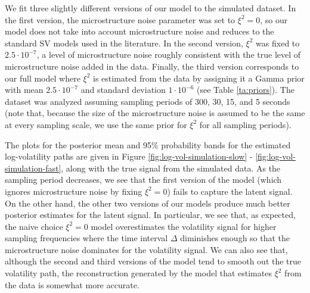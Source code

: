 We fit three slightly different versions of our model to the simulated dataset.  In the first version, the microstructure noise parameter was set to $\xi^2 = 0$, so our model does not take into account microstructure noise and reduces to the standard SV models used in the literature. In the second version, $\xi^2$ was fixed to $2.5\cdot 10^{-7}$, a level of microstructure noise roughly consistent with the true level of microstructure noise added in the data.  Finally, the third version corresponds to our full model where $\xi^2$ is estimated from the data by assigning it a Gamma prior with mean $2.5\cdot 10^{-7}$ and standard deviation $1\cdot 10^{-6}$ (see Table \ref{ta:priors}).  The dataset was analyzed assuming sampling periods of 300, 30, 15, and 5 seconds (note that, because the size of the microstructure noise is assumed to be the same at every sampling scale, we use the same prior for $\xi^2$ for all sampling periods).

The plots for the posterior mean and 95\% probability bands for the estimated log-volatility paths are given in Figure \ref{fig:log-vol-simulation-slow} - \ref{fig:log-vol-simulation-fast}, along with the true signal from the simulated data. As the sampling period decreases, we see that the first version of the model (which ignores microstructure noise by fixing $\xi^2 = 0$) fails to capture the latent signal. On the other hand, the other two versions of our models produce much better posterior estimates for the latent signal. In particular, we see that, as expected, the naive choice $\xi^2 = 0$ model overestimates the volatility signal for higher sampling frequencies where the time interval $\Delta$ diminishes enough so that the microstructure noise dominates for the volatility signal.  We can also see that, although the second and third versions of the model tend to smooth out the true volatility path, the reconstruction generated by the model that estimates $\xi^2$ from the data is somewhat more accurate.

